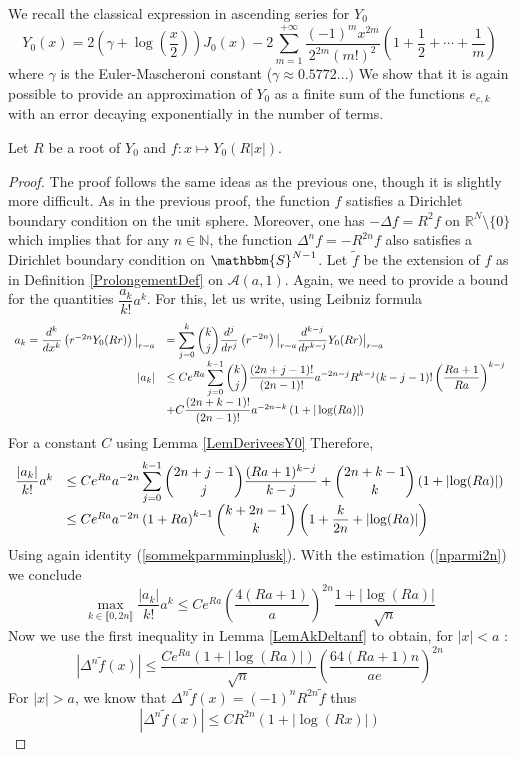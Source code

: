 \documentclass[11pt,a4paper]{article}
\begin{document}
We recall the classical expression in ascending series for $Y_0$ \cite{watson1995treatise}
\[ Y_0(x) = 2\left(\gamma + \log\left(\dfrac{x}{2}\right)\right) J_0(x) - 2 \sum_{m=1}^{+\infty}\dfrac{(-1)^mx^{2m}}{2^{2m}(m!)^2}\left(1+ \dfrac{1}{2} + \cdots + \frac{1}{m}\right) \]
where $\gamma$ is the Euler-Mascheroni constant ($\gamma \approx 0.5772...)$
We show that it is again possible to provide an approximation of $Y_0$ as a finite sum of the functions $e_{c,k}$ with an error decaying exponentially in the number of terms.
\begin{The} Let $R$ be a root of $Y_0$ and $f : x \mapsto Y_0(R|x|)$. 

\begin{proof} The proof follows the same ideas as the previous one, though it is slightly more difficult.
As in the previous proof, the function $f$ satisfies a Dirichlet boundary condition on the unit sphere. Moreover, one has $-\Delta f = R^2 f$ on $\mathbb{R}^N\setminus{\{0\}}$ which implies that for any $n \in \mathbb{N}$, the function $\Delta^n f = - R^{2n} f$ also satisfies a Dirichlet boundary condition on $\mathbbm{S}^{N-1}$. Let $\tilde{f}$ be the extension of $f$ as in Definition \ref{ProlongementDef} on $\mathcal{A}(a,1)$. Again, we need to provide a bound for the quantities $\dfrac{a_k}{k!}a^k$. For this, let us write, using Leibniz formula
\[ \begin{array}{rl}
a_k = \dfrac{d^k}{dx^k} \left(r^{-2n} Y_0(Rr)\right)\big|_{r=a} &= \displaystyle\sum_{j=0}^k \dbinom{k}{j} \dfrac{d^j}{dr^j}\left(r^{-2n}\right)\big|_{r=a}\dfrac{d^{k-j}}{dr^{k-j}}Y_0(Rr)\big|_{r=a} \\
|a_k| & \leq C e^{Ra}\displaystyle\sum_{j=0}^{k-1}\dbinom{k}{j}\dfrac{(2n+j-1)!}{(2n-1)!}a^{-2n-j} R^{k-j}(k-j-1)!\left(\dfrac{Ra+1}{Ra}\right)^{k-j}\\
& + C \dfrac{(2n+k-1)!}{(2n-1)!}a^{-2n-k}\left(1+|\log(Ra)|\right) \\ 
\end{array} \] 
For a constant $C$ using Lemma \ref{LemDeriveesY0} 
Therefore, 
\[\begin{array}{rl}
\dfrac{|a_k|}{k!}a^k & \leq C e^{Ra} a^{-2n}\displaystyle\sum_{j=0}^{k-1}\dbinom{2n+j-1}{j}\dfrac{(Ra+1)^{k-j}}{k-j} + \dbinom{2n+k-1}{k} \left(1+\left|\log(Ra)\right|\right)  \\
& \leq Ce^{Ra}a^{-2n}\left(1+Ra\right)^{k-1} \dbinom{k+2n-1}{k} \left(1+\dfrac{k}{2n}+\left|\log(Ra)\right|\right)
\end{array} \] 
Using again identity (\ref{sommekparmminplusk}). With the estimation (\ref{nparmi2n}) we conclude
\[\max_{k\in\llbracket 0,2n\rrbracket} \dfrac{|a_k|}{k!}a^k \leq Ce^{Ra}\left(\dfrac{4\left(Ra+1\right)}{a}\right)^{2n}\dfrac{1+|\log(Ra)|}{\sqrt{n}}\]
Now we use the first inequality in Lemma \ref{LemAkDeltanf} to obtain, for $|x| < a$ : \[ \left| \Delta^n \tilde{f}(x)\right| \leq \dfrac{Ce^{Ra}(1+|\log(Ra)|)}{\sqrt{n}}\left(\dfrac{64(Ra+1)n}{ae}\right)^{2n}\]
For $|x| > a$, we know that $\Delta^n \tilde{f}(x) = (-1)^nR^{2n}\tilde{f}$ thus 
\[\left|\Delta^n \tilde{f}(x)\right| \leq C R^{2n}\left(1+\left|\log(Rx)\right|\right)\]


\end{proof}
\end{The}
\end{document}
